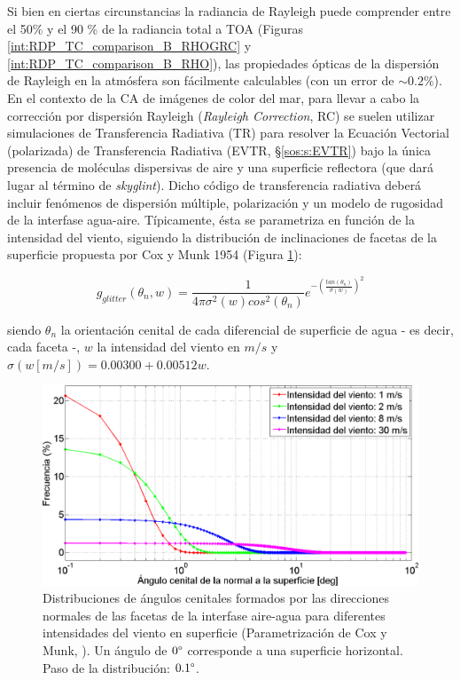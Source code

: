     
    Si bien en ciertas circunstancias la radiancia de Rayleigh puede comprender entre el 50\% y el 90 \% de la radiancia total a TOA (Figuras \ref{int:RDP_TC_comparison_B_RHOGRC} y \ref{int:RDP_TC_comparison_B_RHO}), las propiedades ópticas de la dispersión de Rayleigh en la atmósfera son fácilmente calculables (con un error de $\sim 0.2\%$). En el contexto de la CA de imágenes de color del mar, para llevar a cabo la corrección por dispersión Rayleigh (\textit{Rayleigh Correction}, RC) se suelen utilizar simulaciones de Transferencia Radiativa (TR) para resolver la Ecuación Vectorial (polarizada) de Transferencia Radiativa (EVTR, \S \ref{sos:s:EVTR}) bajo la única presencia de moléculas dispersivas de aire y una superficie reflectora (que dará lugar al término de \textit{skyglint}). Dicho código de transferencia radiativa deberá incluir fenómenos de dispersión múltiple, polarización y un modelo de rugosidad de la interfase agua-aire. Típicamente, ésta se parametriza en función de la intensidad del viento, siguiendo la distribución de inclinaciones de facetas de la superficie propuesta por Cox y Munk 1954 \cite{coxmunk1954} (Figura \ref{int:coxmunk}):
    
    \begin{equation}
        g_{glitter}(\theta_{n},w) = \frac{1}{4\pi\sigma^{2}(w)cos^{2}(\theta_{n})}e^{-\left(\frac{tan(\theta_{n})}{\sigma(w)}\right)^{2}}
        \label{int:eq:coxmunk}
    \end{equation}
    
    \noindent siendo $\theta_{n}$ la orientación cenital de cada diferencial de superficie de agua - es decir, cada faceta -, $w$ la intensidad del viento en $m/s$ y $\sigma(w[m/s]) = 0.00300 + 0.00512w$.


    \begin{figure}
    \centering
    \includegraphics[width=\textwidth]{int/figures/coxmunk.png}
    \caption[Distribuciones de ángulos cenitales de las facetas de la interfase aire-agua para diferentes intensidades del viento en superficie.]{Distribuciones de ángulos cenitales formados por las direcciones normales de las facetas de la interfase aire-agua para diferentes intensidades del viento en superficie (Parametrización de Cox y Munk, \cite{coxmunk1954}). Un ángulo de $0\degree$ corresponde a una superficie horizontal. Paso de la distribución: $0.1\degree$.}
    \label{int:coxmunk}
    \end{figure}

